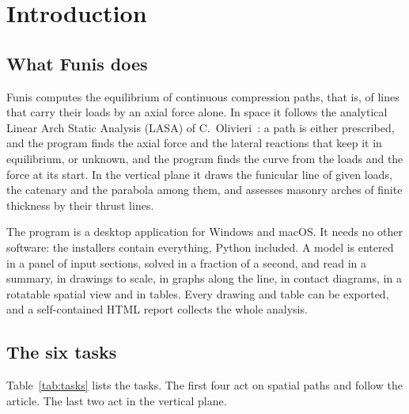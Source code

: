 \documentclass[fontsize=10.5pt,paper=a4,parskip=half,headings=normal,numbers=noenddot,
  open=any,bibliography=totoc,captions=tableheading]{scrreprt}
\numberwithin{figure}{chapter}
\numberwithin{table}{chapter}
\begin{document}
\chapter{Introduction}\label{ch:intro}

\section{What Funis does}

Funis computes the equilibrium of continuous compression paths, that is, of lines that carry their loads
by an axial force alone. In space it follows the analytical Linear Arch Static Analysis (LASA) of
C.~Olivieri~\cite{article}: a path is either prescribed, and the program finds the axial force and the
lateral reactions that keep it in equilibrium, or unknown, and the program finds the curve from the
loads and the force at its start. In the vertical plane it draws the funicular line of given loads, the
catenary and the parabola among them, and assesses masonry arches of finite thickness by their thrust
lines.

The program is a desktop application for Windows and macOS. It needs no other software: the installers
contain everything, Python included. A model is entered in a panel of input sections, solved in a
fraction of a second, and read in a summary, in drawings to scale, in graphs along the line, in contact
diagrams, in a rotatable spatial view and in tables. Every drawing and table can be exported, and a
self-contained HTML report collects the whole analysis.

\section{The six tasks}

Table~\ref{tab:tasks} lists the tasks. The first four act on spatial paths and follow the article. The
last two act in the vertical plane.
\end{document}
